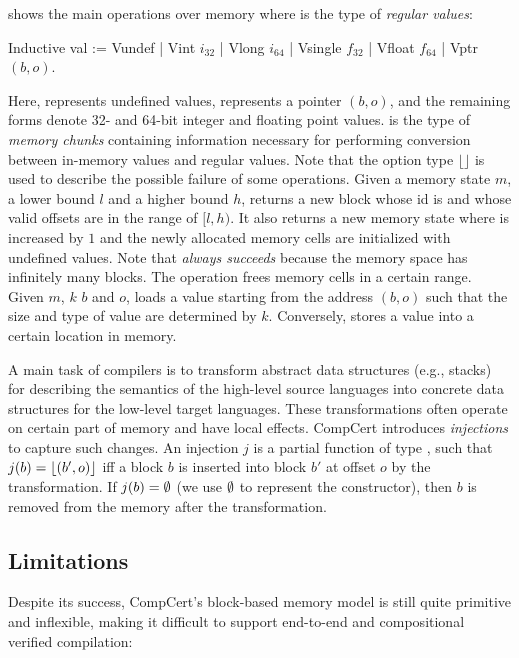  shows the main operations over memory where
 is the type of \emph{regular values}:
%
\begin{coq}
   Inductive val := Vundef | Vint $i_{32}$ | Vlong $i_{64}$ | Vsingle $f_{32}$ | Vfloat $f_{64}$ | Vptr $(b,o)$.
\end{coq}
%
Here,  represents undefined values, 
represents a pointer $(b,o)$, and the remaining forms denote 32- and
64-bit integer and floating point values.
%
 is the type of \emph{memory chunks} containing
information necessary for performing conversion between in-memory
values and regular values.
%
Note that the option type $\lfloor \rfloor$ is used to describe the
possible failure of some operations.  Given a memory state $m$, a
lower bound $l$ and a higher bound $h$, 
returns a new block whose id is  and whose valid
offsets are in the range of $[l,h)$. It also returns a new memory state
  where \nextblock is increased by $1$ and the newly allocated memory
  cells are initialized with undefined values.
%
Note that  \emph{always succeeds} because the memory space
has infinitely many blocks. The  operation frees memory
cells in a certain range. Given $m$, $k$ $b$ and $o$,
loads a value starting from the address $(b,o)$ such
that the size and type of value are determined by $k$.  Conversely,
 stores a value into a certain location in memory.

A main task of compilers is to transform abstract data structures
(e.g., stacks) for describing the semantics of the high-level source
languages into concrete data structures for the low-level target
languages. These transformations often operate on certain part of
memory and have local effects.
%
CompCert introduces \emph{injections} to capture such changes. An
injection $j$ is a partial function of type
, such that $j(b) =
\lfloor (b',o) \rfloor$ iff a block $b$ is inserted into block $b'$ at offset
$o$ by the transformation. If $j(b) = \emptyset$ (we use $\emptyset$ to
represent the  constructor), then $b$ is removed from the
memory after the transformation.

\subsection{Limitations}
\label{ssec:intro-nmm}

Despite its success, CompCert's block-based memory model is
still quite primitive and inflexible, making it difficult to support
end-to-end and compositional verified compilation: 

